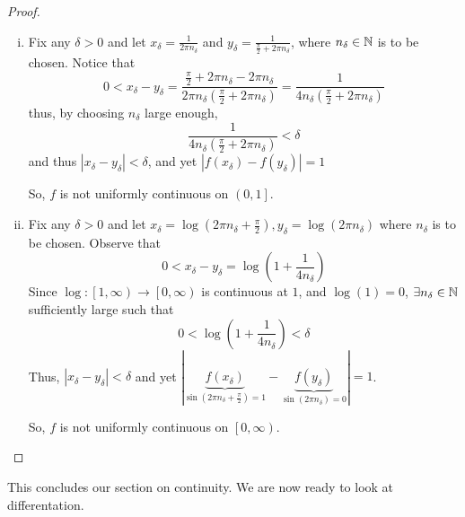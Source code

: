 \begin{proof}
    \text{}
    \begin{enumerate}[(i)]
        \item Fix any $\delta > 0$ and let $x_\delta = \frac{1}{2\pi n_\delta}$ and $y_\delta = \frac{1}{\frac{\pi}{2} + 2\pi n_\delta}$, 
        where $n_\delta \in \mathbb N$ is to be chosen. Notice that 
        $$0 < x_\delta - y_\delta = \frac{\frac{\pi}{2} + 2\pi n_\delta- 2\pi n_\delta}{2\pi n_\delta\left(\frac{\pi}{2} + 2\pi n_\delta\right)} = \frac{1}{4 n_\delta\left(\frac{\pi}{2} + 2\pi n_\delta\right)}$$
        thus, by choosing $n_\delta$ large enough, 
        $$\frac{1}{4 n_\delta\left(\frac{\pi}{2} + 2\pi n_\delta\right)} < \delta$$
        and thus $|x_\delta - y_\delta| < \delta$, and yet $|f(x_\delta) - f(y_\delta)| = 1$

        So, $f$ is not uniformly continuous on $\left(0, 1\right]$.
        \item Fix any $\delta > 0$ and let 
        $x_\delta = \log\left(2\pi n_\delta + \frac{\pi}{2}\right), y_\delta = \log(2\pi n_\delta) $
        where $n_\delta$ is to be chosen. Observe that 
        $$0 < x_\delta - y_\delta = \log\left(1 + \frac{1}{4 n_\delta}\right)$$
        Since $\log : \left[1, \infty\right) \to \left[0, \infty\right)$ is continuous at $1$, and $\log(1) = 0$, 
        $\exists n_\delta \in \mathbb N$ sufficiently large such that
        $$0 < \log\left(1 + \frac{1}{4n_\delta}\right) < \delta$$
        Thus, $|x_\delta - y_\delta| < \delta$ and yet $|\underbrace{f(x_\delta)}_{\sin\left(2\pi n_\delta + \frac{\pi}{2}\right) = 1} - \underbrace{f(y_\delta)}_{\sin(2\pi n_\delta) = 0}| = 1$.

        So, $f$ is not uniformly continuous on $\left[0, \infty\right)$.
    \end{enumerate}
\end{proof}

This concludes our section on continuity. We are now ready to look at differentation.